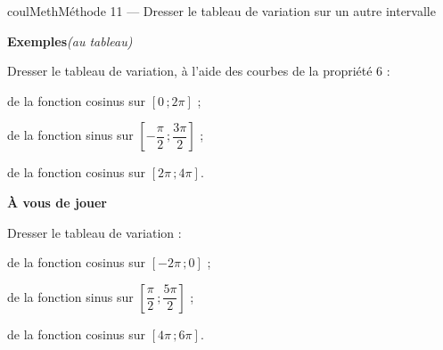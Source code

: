 \documentclass[11pt,a4paper]{article}
\makeatletter
\newcommand{\lycee@intff}[2]{\left[#1\,;#2\right]}
\providecommand{\intff}{\lycee@intff}%
\newcounter{lycee@signet}
\newcommand{\signet}[3][]{\stepcounter{lycee@signet}%
  \edef\lycee@dest{\if\relax\detokenize{#1}\relax
    signet.\arabic{lycee@signet}\else#1\fi}%
  \hypertarget{\lycee@dest}{}\bookmark[level=#2,dest=\lycee@dest]{#3}}
\newcounter{methode}
\newenvironment{methodebox}[1][Méthode]{\stepcounter{methode}%
  \begin{boitecours}[phantom={\signet[methode-\arabic{methode}]{2}{#1}}]{coulMeth}{#1}}%
  {\end{boitecours}}
\newcommand{\etape}[1]{\par\smallskip\textbf{\color{coulMeth}#1}\par\nobreak\smallskip}
\newcommand{\autableau}{\hfill{\footnotesize\itshape\color{black!45}(au tableau)}}
\newcommand{\etapeexemples}{%
    \par\smallskip\textbf{\color{coulMeth}Exemples}\autableau\par\nobreak\smallskip}
\makeatother
\begin{document}
\begin{methodebox}[Méthode 11 --- Dresser le tableau de variation sur un autre intervalle]
\etapeexemples
Dresser le tableau de variation, à l'aide des courbes de la propriété 6 :
\begin{questions}[label=\alph*)]
  \item de la fonction cosinus sur $\intff{0}{2\pi}$ ;
  \item de la fonction sinus sur $\intff{-\dfrac{\pi}{2}}{\dfrac{3\pi}{2}}$ ;
  \item de la fonction cosinus sur $\intff{2\pi}{4\pi}$.
\end{questions}

\etape{À vous de jouer}
Dresser le tableau de variation :
\begin{questions}[label=\alph*)]
  \item de la fonction cosinus sur $\intff{-2\pi}{0}$ ;
  \item de la fonction sinus sur $\intff{\dfrac{\pi}{2}}{\dfrac{5\pi}{2}}$ ;
  \item de la fonction cosinus sur $\intff{4\pi}{6\pi}$.
\end{questions}

\end{methodebox}
\end{document}
